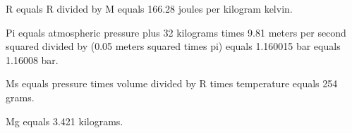 R equals R divided by M equals 166.28 joules per kilogram kelvin.  

Pi equals atmospheric pressure plus 32 kilograms times 9.81 meters per second squared divided by (0.05 meters squared times pi) equals 1.160015 bar equals 1.16008 bar.  

Ms equals pressure times volume divided by R times temperature equals 254 grams.  

Mg equals 3.421 kilograms.